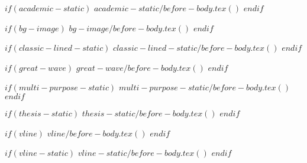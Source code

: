 $if(academic-static)$
$academic-static/before-body.tex()$
$endif$

$if(bg-image)$
$bg-image/before-body.tex()$
$endif$

$if(classic-lined-static)$
$classic-lined-static/before-body.tex()$
$endif$

$if(great-wave)$
$great-wave/before-body.tex()$
$endif$

$if(multi-purpose-static)$
$multi-purpose-static/before-body.tex()$
$endif$

$if(thesis-static)$
$thesis-static/before-body.tex()$
$endif$

$if(vline)$
$vline/before-body.tex()$
$endif$

$if(vline-static)$
$vline-static/before-body.tex()$
$endif$
